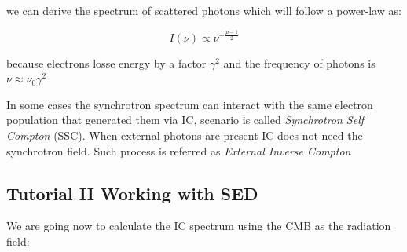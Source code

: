 \documentclass[
  letterpaper,
  DIV=11,
  numbers=noendperiod]{scrreprt}
\begin{document}
we can derive the spectrum of scattered photons which will follow a
power-law as:

\[ I(\nu) \propto \nu^{-\frac{p-1}{2}} \]

because electrons losse energy by a factor \(\gamma^2\) and the
frequency of photons is \(\nu \approx \nu_0 \gamma^2\)

\begin{tcolorbox}[enhanced jigsaw, colframe=quarto-callout-note-color-frame, leftrule=.75mm, left=2mm, opacitybacktitle=0.6, colbacktitle=quarto-callout-note-color!10!white, coltitle=black, arc=.35mm, titlerule=0mm, toprule=.15mm, opacityback=0, bottomrule=.15mm, breakable, bottomtitle=1mm, rightrule=.15mm, toptitle=1mm, colback=white, title=\textcolor{quarto-callout-note-color}{\faInfo}\hspace{0.5em}{Note}]

In some cases the synchrotron spectrum can interact with the same
electron population that generated them via IC, scenario is called
\emph{Synchrotron Self Compton} (SSC). When external photons are present
IC does not need the synchrotron field. Such process is referred as
\emph{External Inverse Compton}

\end{tcolorbox}

\subsection{Tutorial II Working with
SED}\label{tutorial-ii-working-with-sed}

We are going now to calculate the IC spectrum using the CMB as the
radiation field:
\end{document}
